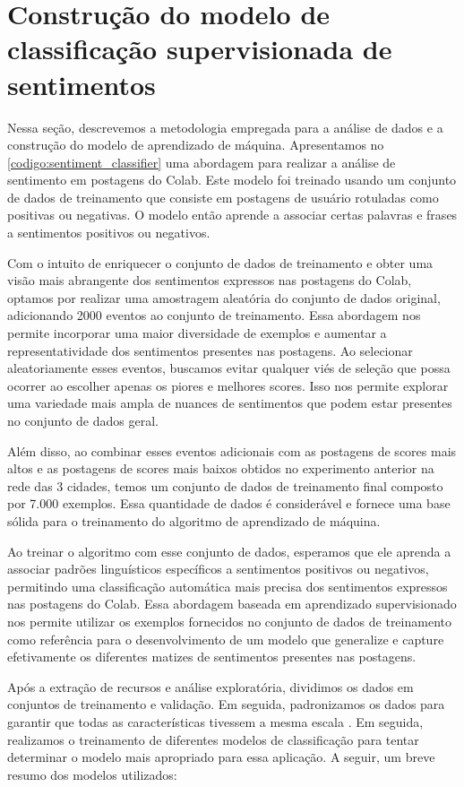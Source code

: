 \section{Construção do modelo de classificação supervisionada de sentimentos}

Nessa seção, descrevemos a metodologia empregada para a análise de dados e a construção do modelo de aprendizado de máquina. Apresentamos no \autoref{codigo:sentiment_classifier} uma abordagem para realizar a análise de sentimento em postagens do Colab. Este modelo foi treinado usando um conjunto de dados de treinamento que consiste em postagens de usuário rotuladas como positivas ou negativas. O modelo então aprende a associar certas palavras e frases a sentimentos positivos ou negativos.

Com o intuito de enriquecer o conjunto de dados de treinamento e obter uma visão mais abrangente dos sentimentos expressos nas postagens do Colab, optamos por realizar uma amostragem aleatória do conjunto de dados original, adicionando 2000 eventos ao conjunto de treinamento. Essa abordagem nos permite incorporar uma maior diversidade de exemplos e aumentar a representatividade dos sentimentos presentes nas postagens. Ao selecionar aleatoriamente esses eventos, buscamos evitar qualquer viés de seleção que possa ocorrer ao escolher apenas os piores e melhores scores. Isso nos permite explorar uma variedade mais ampla de nuances de sentimentos que podem estar presentes no conjunto de dados geral.

Além disso, ao combinar esses eventos adicionais com as postagens de scores mais altos e as postagens de scores mais baixos obtidos no experimento anterior na rede das 3 cidades, temos um conjunto de dados de treinamento final composto por 7.000 exemplos. Essa quantidade de dados é considerável e fornece uma base sólida para o treinamento do algoritmo de aprendizado de máquina.

Ao treinar o algoritmo com esse conjunto de dados, esperamos que ele aprenda a associar padrões linguísticos específicos a sentimentos positivos ou negativos, permitindo uma classificação automática mais precisa dos sentimentos expressos nas postagens do Colab. Essa abordagem baseada em aprendizado supervisionado nos permite utilizar os exemplos fornecidos no conjunto de dados de treinamento como referência para o desenvolvimento de um modelo que generalize e capture efetivamente os diferentes matizes de sentimentos presentes nas postagens.

Após a extração de recursos e análise exploratória, dividimos os dados em conjuntos de treinamento e validação. Em seguida, padronizamos os dados para garantir que todas as características tivessem a mesma escala \cite{2000_Jain}. Em seguida, realizamos o treinamento de diferentes modelos de classificação para tentar determinar o modelo mais apropriado para essa aplicação. A seguir, um breve resumo dos modelos utilizados:

